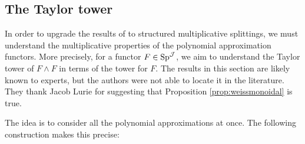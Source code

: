 \subsection{The Taylor tower}
In order to upgrade the results of \cite{Arone} to structured multiplicative splittings, we must understand the multiplicative properties of the polynomial approximation functors.  More precisely, for a functor $F\in \operatorname{\text{Sp}}^{\operatorname{\mathcal{J}}}$, we aim to understand the Taylor tower of $F\wedge F$ in terms of the tower for $F.$  The results in this section are likely known to experts, but the authors were not able to locate it in the literature.  They thank Jacob Lurie for suggesting that Proposition \ref{prop:weissmonoidal} is true.  

The idea is to consider all the polynomial approximations at once.  The following construction makes this precise:



